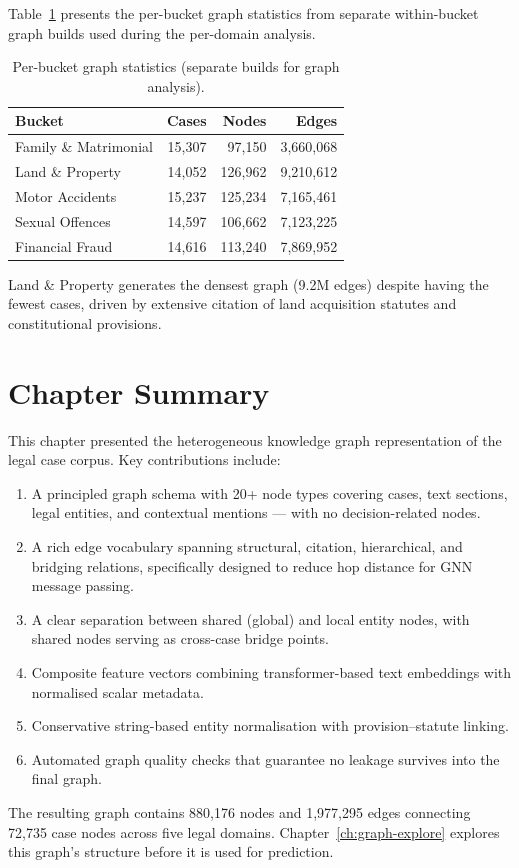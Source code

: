 Table~\ref{tab:per-bucket-graph} presents the per-bucket graph statistics from separate within-bucket graph builds used during the per-domain analysis.

\begin{table}[H]
\centering
\caption{Per-bucket graph statistics (separate builds for graph analysis).}
\label{tab:per-bucket-graph}
\begin{tabular}{@{}lrrr@{}}
\toprule
\textbf{Bucket} & \textbf{Cases} & \textbf{Nodes} & \textbf{Edges} \\
\midrule
Family \& Matrimonial  & 15,307 &  97,150 &  3,660,068 \\
Land \& Property       & 14,052 & 126,962 &  9,210,612 \\
Motor Accidents        & 15,237 & 125,234 &  7,165,461 \\
Sexual Offences        & 14,597 & 106,662 &  7,123,225 \\
Financial Fraud        & 14,616 & 113,240 &  7,869,952 \\
\bottomrule
\end{tabular}
\end{table}

Land \& Property generates the densest graph (9.2M edges) despite having the fewest cases, driven by extensive citation of land acquisition statutes and constitutional provisions.

\section{Chapter Summary}
\label{sec:ch5-summary}

This chapter presented the heterogeneous knowledge graph representation of the legal case corpus. Key contributions include:

\begin{enumerate}
    \item A principled graph schema with 20+ node types covering cases, text sections, legal entities, and contextual mentions — with no decision-related nodes.
    \item A rich edge vocabulary spanning structural, citation, hierarchical, and bridging relations, specifically designed to reduce hop distance for GNN message passing.
    \item A clear separation between shared (global) and local entity nodes, with shared nodes serving as cross-case bridge points.
    \item Composite feature vectors combining transformer-based text embeddings with normalised scalar metadata.
    \item Conservative string-based entity normalisation with provision--statute linking.
    \item Automated graph quality checks that guarantee no leakage survives into the final graph.
\end{enumerate}

The resulting graph contains 880,176 nodes and 1,977,295 edges connecting 72,735 case nodes across five legal domains. Chapter~\ref{ch:graph-explore} explores this graph's structure before it is used for prediction.
